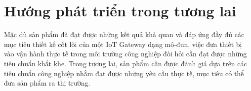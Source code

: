 
\section{Hướng phát triển trong tương lai}
    Mặc dù sản phẩm đã đạt được những kết quả khả quan và đáp ứng đầy đủ các mục tiêu thiết kế cốt lõi của một IoT Gateway dạng mô-đun, việc đưa thiết bị vào vận hành thực tế trong môi trường công nghiệp đòi hỏi cần đạt được những tiêu chuẩn khắt khe. Trong tương lai, sản phẩm cần được đánh giá dựa trên các tiêu chuẩn công nghiệp nhằm đạt được những yêu cầu thực tế, mục tiêu có thể đưa sản phẩm ra thị trường.






